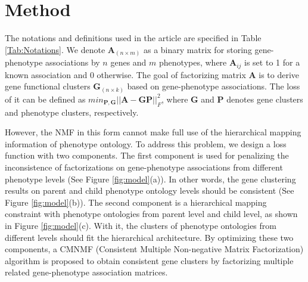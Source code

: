 \documentclass{bmcart}
\begin{document}

\section*{Method}
The notations and definitions used in the article are specified in Table \ref{Tab:Notations}. We denote $\bm{A}_{(n \times m)}$ as a binary matrix for storing gene-phenotype associations by $n$ genes and $m$ phenotypes, where $\bm{A}_{ij}$ is set to 1 for a known association and 0 otherwise. The goal of factorizing matrix $\bm{A}$ is to derive gene functional clusters $\bm{G}_{(n \times k)}$ based on gene-phenotype associations. The loss of it can be defined as $min _{\bm{P},\bm{G}} ||\bm{A}-\bm{GP}||^{2}_{F}$, where $\bm{G}$ and $\bm{P}$ denotes gene clusters and phenotype clusters, respectively.

However, the NMF in this form cannot make full use of the hierarchical mapping information of phenotype ontology. To address this problem, we design a loss function with two components. The first component is used for penalizing the inconsistence of factorizations on gene-phenotype associations from different phenotype levels (See Figure \ref{fig:model}(a)). In other words, the gene clustering results on parent and child phenotype ontology levels should be consistent (See Figure \ref{fig:model}(b)). The second component is a hierarchical mapping constraint with phenotype ontologies from parent level and child level, as shown in Figure \ref{fig:model}(c). With it, the clusters of phenotype ontologies from different levels should fit the hierarchical architecture. By optimizing these two components, a CMNMF (Consistent Multiple Non-negative Matrix Factorization) algorithm is proposed to obtain consistent gene clusters by factorizing multiple related gene-phenotype association matrices.
\end{document}
